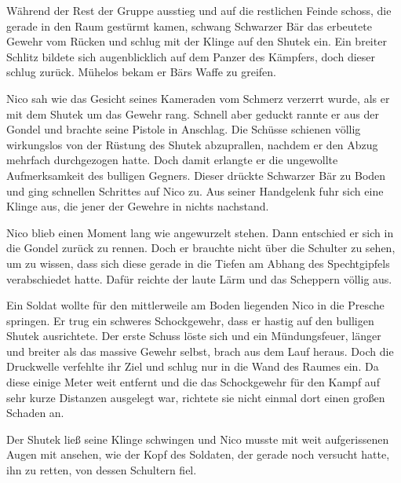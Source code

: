 \par

Während der Rest der Gruppe ausstieg und auf die restlichen Feinde schoss, die gerade in den Raum gestürmt kamen, schwang Schwarzer Bär das erbeutete Gewehr vom Rücken und schlug mit der Klinge auf den Shutek ein. Ein breiter Schlitz bildete sich augenblicklich auf dem Panzer des Kämpfers, doch dieser schlug zurück. Mühelos bekam er Bärs Waffe zu greifen.

\par

Nico sah wie das Gesicht seines Kameraden vom Schmerz verzerrt wurde, als er mit dem Shutek um das Gewehr rang. Schnell aber geduckt rannte er aus der Gondel und brachte seine Pistole in Anschlag. Die Schüsse schienen völlig wirkungslos von der Rüstung des Shutek abzuprallen, nachdem er den Abzug mehrfach durchgezogen hatte. Doch damit erlangte er die ungewollte Aufmerksamkeit des bulligen Gegners. Dieser drückte Schwarzer Bär zu Boden und ging schnellen Schrittes auf Nico zu. Aus seiner Handgelenk fuhr sich eine Klinge aus, die jener der Gewehre in nichts nachstand.

\par

Nico blieb einen Moment lang wie angewurzelt stehen. Dann entschied er sich in die Gondel zurück zu rennen. Doch er brauchte nicht über die Schulter zu sehen, um zu wissen, dass sich diese gerade in die Tiefen am Abhang des Spechtgipfels verabschiedet hatte. Dafür reichte der laute Lärm und das Scheppern völlig aus.

\par

Ein Soldat wollte für den mittlerweile am Boden liegenden Nico in die Presche springen. Er trug ein schweres Schockgewehr, dass er hastig auf den bulligen Shutek ausrichtete. Der erste Schuss löste sich und ein Mündungsfeuer, länger und breiter als das massive Gewehr selbst, brach aus dem Lauf heraus. Doch die Druckwelle verfehlte ihr Ziel und schlug nur in die Wand des Raumes ein. Da diese einige Meter weit entfernt und die das Schockgewehr für den Kampf auf sehr kurze Distanzen ausgelegt war, richtete sie nicht einmal dort einen großen Schaden an.

\par

Der Shutek ließ seine Klinge schwingen und Nico musste mit weit aufgerissenen Augen mit ansehen, wie der Kopf des Soldaten, der gerade noch versucht hatte, ihn zu retten, von dessen Schultern fiel.

